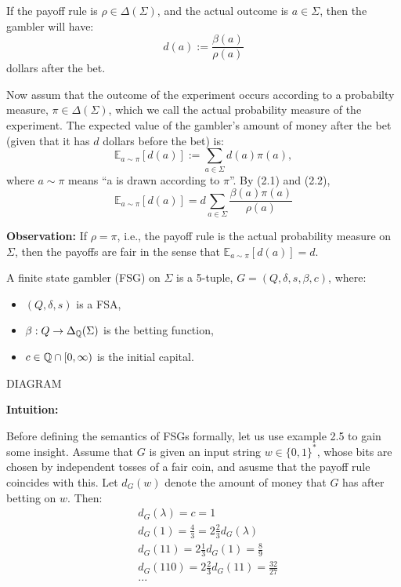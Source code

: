 \documentclass[../main.tex]{subfiles}
\begin{document}
    If the payoff rule is $\rho \in \Delta(\Sigma)$, and the actual outcome is
$a \in \Sigma$, then the gambler will have:
\begin{equation}
    d(a) := \frac{\beta(a)}{\rho(a)}
\end{equation}
dollars after the bet.

    Now assum that the outcome of the experiment occurs according to a probabilty
measure, $\pi \in \Delta(\Sigma)$, which we call the actual probability measure
of the experiment. The expected value of the gambler's amount of money after the
bet (given that it has $d$ dollars before the bet) is:
\begin{equation}
    \mathbb{E}_{a\sim\pi}[d(a)] := \sum_{a \in \Sigma} d(a)\pi(a),
\end{equation}
where $a\sim\pi$ means ``a is drawn according to $\pi$''. By (2.1) and (2.2),
\begin{equation}
    \mathbb{E}_{a\sim\pi}[d(a)] = d \sum_{a \in \Sigma} \frac{\beta(a)\pi(a)}{\rho(a)}
\end{equation}

\textbf{Observation:}
If $\rho = \pi$, i.e., the payoff rule is the actual probability measure on $\Sigma$,
then the payoffs are fair in the sense that $\mathbb{E}_{a \sim \pi}[d(a)] = d$.

\begin{defn}
    A finite state gambler (FSG) on $\Sigma$ is a 5-tuple, $G = (Q, \delta, s, \beta, c)$, where:
\begin{itemize}
    \item $(Q, \delta, s)$ is a FSA,
    \item $\beta: Q \rightarrow \Delta_{\mathbb{Q}}(\Sigma)$ is the betting function,
    \item $c \in \mathbb{Q} \cap [0, \infty)$ is the initial capital.
\end{itemize}
\end{defn}

\begin{exmp}
    DIAGRAM
\end{exmp}

\textbf{Intuition:}

    Before defining the semantics of FSGs formally, let us use example 2.5 to
gain some insight. Assume that $G$ is given an input string $w \in \{0, 1\}^{*}$,
whose bits are chosen by independent tosses of a fair coin, and asusme that the
payoff rule coincides with this. Let $d_{G}(w)$ denote the amount of money that
$G$ has after betting on $w$. Then:
\begin{align*}
    & d_{G}(\lambda) = c = 1 \\
    & d_{G}(1) = \frac{4}{3} = 2\frac{2}{3}d_{G}(\lambda) \\
    & d_{G}(11) = 2\frac{1}{3}d_{G}(1) = \frac{8}{9} \\
    & d_{G}(110) = 2\frac{2}{3}d_{G}(11) = \frac{32}{27} \\
    & ...
\end{align*}
\end{document}
